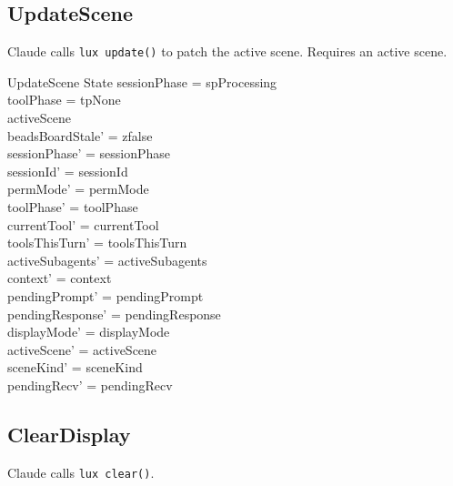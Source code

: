 \documentclass[a4paper,10pt,fleqn]{article}
\begin{document}
\subsection{UpdateScene}

Claude calls \texttt{lux update()} to patch the active scene.
Requires an active scene.

\begin{schema}{UpdateScene}
  \Delta State
  \where
  sessionPhase = spProcessing \\
  toolPhase = tpNone \\
  activeScene \neq \emptyset \\
  beadsBoardStale' = zfalse \\
  sessionPhase' = sessionPhase \\
  sessionId' = sessionId \\
  permMode' = permMode \\
  toolPhase' = toolPhase \\
  currentTool' = currentTool \\
  toolsThisTurn' = toolsThisTurn \\
  activeSubagents' = activeSubagents \\
  context' = context \\
  pendingPrompt' = pendingPrompt \\
  pendingResponse' = pendingResponse \\
  displayMode' = displayMode \\
  activeScene' = activeScene \\
  sceneKind' = sceneKind \\
  pendingRecv' = pendingRecv
\end{schema}

\subsection{ClearDisplay}

Claude calls \texttt{lux clear()}.
\end{document}
